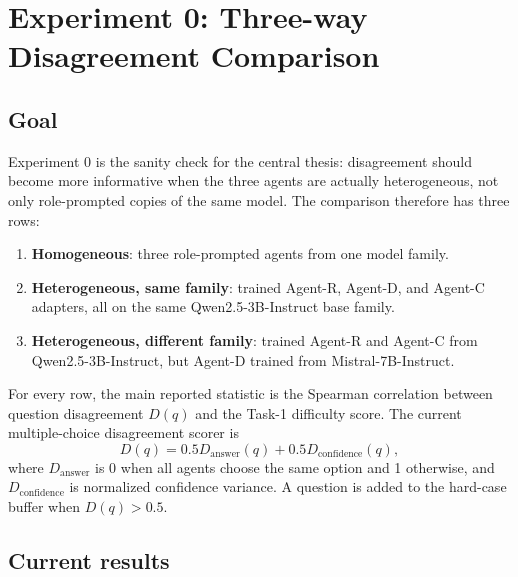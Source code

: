 \documentclass{article}
\begin{document}
\section{Experiment 0: Three-way Disagreement Comparison}

\subsection{Goal}

Experiment 0 is the sanity check for the central thesis: disagreement should
become more informative when the three agents are actually heterogeneous, not
only role-prompted copies of the same model. The comparison therefore has
three rows:

\begin{enumerate}
\item \textbf{Homogeneous}: three role-prompted agents from one model family.
\item \textbf{Heterogeneous, same family}: trained Agent-R, Agent-D, and
Agent-C adapters, all on the same Qwen2.5-3B-Instruct base family.
\item \textbf{Heterogeneous, different family}: trained Agent-R and Agent-C
from Qwen2.5-3B-Instruct, but Agent-D trained from Mistral-7B-Instruct.
\end{enumerate}

For every row, the main reported statistic is the Spearman correlation between
question disagreement \(D(q)\) and the Task-1 difficulty score. The current
multiple-choice disagreement scorer is
\[
D(q)=0.5D_{\mathrm{answer}}(q)+0.5D_{\mathrm{confidence}}(q),
\]
where \(D_{\mathrm{answer}}\) is 0 when all agents choose the same option and
1 otherwise, and \(D_{\mathrm{confidence}}\) is normalized confidence
variance. A question is added to the hard-case buffer when \(D(q)>0.5\).

\subsection{Current results}
\end{document}
